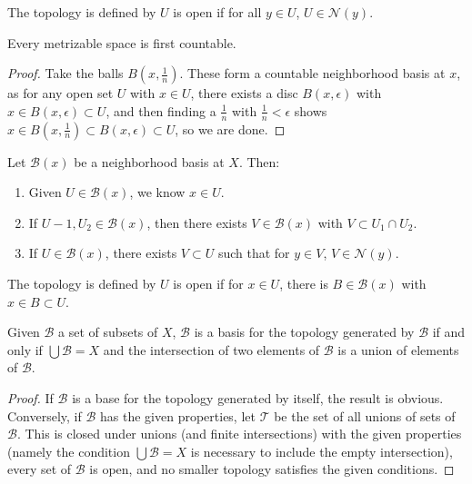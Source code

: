 \documentclass[12pt,letterpaper,reqno]{article}
\begin{document}
The topology is defined by $U$ is open if for all $y \in U$, $U \in \mathcal{N}(y)$.

\begin{theorem}
    Every metrizable space is first countable.
\end{theorem}

\begin{proof}
    Take the balls $B(x, \frac{1}{n})$. These form a countable neighborhood basis at $x$, as for any open set $U$ with $x \in U$, there exists a disc $B(x, \epsilon)$ with $x \in B(x, \epsilon) \subset U$, and then finding a $\frac{1}{n}$ with $\frac{1}{n} < \epsilon$ shows $x \in B(x, \frac{1}{n}) \subset B(x, \epsilon) \subset U$, so we are done.
\end{proof}

\begin{theorem}\label{neighborhood}
    Let $\mathcal{B}(x)$ be a neighborhood basis at $X$. Then:
    \begin{enumerate}
        \item Given $U \in \mathcal{B}(x)$, we know $x \in U$.
        \item If $U-1, U_2 \in \mathcal{B}(x)$, then there exists $V \in \mathcal{B}(x)$ with $V \subset U_1 \cap U_2$.
        \item If $U \in \mathcal{B}(x)$, there exists $V \subset U$ such that for $y \in V$, $V \in \mathcal{N}(y)$.
    \end{enumerate}
\end{theorem}

The topology is defined by $U$ is open if for $x \in U$, there is $B \in \mathcal{B}(x)$ with $x \in B \subset U$.

\begin{theorem}\label{theorem:topology-generated-by-a-basis}
    Given $\mathcal{B}$ a set of subsets of $X$, $\mathcal{B}$ is a basis for the topology generated by $\mathcal{B}$ if and only if $\bigcup \mathcal{B} = X$ and the intersection of two elements of $\mathcal{B}$ is a union of elements of $\mathcal{B}$.
\end{theorem}

\begin{proof}
    If $\mathcal{B}$ is a base for the topology generated by itself, the result is obvious. Conversely, if $\mathcal{B}$ has the given properties, let $\mathcal{T}$ be the set of all unions of sets of $\mathcal{B}$. This is closed under unions (and finite intersections) with the given properties (namely the condition $\bigcup \mathcal{B} = X$ is necessary to include the empty intersection), every set of $\mathcal{B}$ is open, and no smaller topology satisfies the given conditions.
\end{proof}
\end{document}
